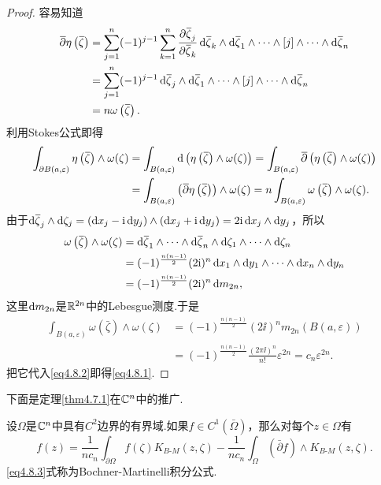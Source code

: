 \begin{proof}
	容易知道
	\begin{align*}
		\bar{\partial}\eta\left(\bar{\zeta}\right)
		&=\sum_{j=1}^{n}(-1)^{j-1}\sum_{k=1}^{n}\pp{\bar{\zeta}_j}{\bar{\zeta}_k}\dif\bar{\zeta}_k\wedge\dif\bar{\zeta}_1\wedge\cdots\wedge[j]\wedge\cdots\wedge\dif\bar{\zeta}_n\\
		&=\sum_{j=1}^{n}(-1)^{j-1}\dif\bar{\zeta}_j\wedge\dif\bar{\zeta}_1\wedge\cdots\wedge[j]\wedge\cdots\wedge\dif\bar{\zeta}_n\\
		&=n\omega\left(\bar{\zeta}\right).
	\end{align*}
利用Stokes公式即得
\begin{align}\label{eq4.8.2}
	\int_{\partial B(a,\varepsilon)} \eta\left({}\mkern1mu\overline{\mkern-1mu\zeta}\right)\wedge\omega(\zeta)
	&=\int_{B(a,\varepsilon)}\mathop{}\!\mathrm{d}\left(\eta\left({}\mkern1mu\overline{\mkern-1mu\zeta}\right)\wedge\omega(\zeta)\right)=\int_{B(a,\varepsilon)}{}\mkern1mu\overline{\mkern-1mu\partial}\left(\eta\left({}\mkern1mu\overline{\mkern-1mu\zeta}\right)\wedge\omega(\zeta)\right)\notag\\
	&=\int_{B(a,\varepsilon)}\left({}\mkern1mu\overline{\mkern-1mu\partial}\eta\left({}\mkern1mu\overline{\mkern-1mu\zeta}\right)\right)\wedge\omega(\zeta)=n\int_{B(a,\varepsilon)}\omega\left({}\mkern1mu\overline{\mkern-1mu\zeta}\right)\wedge\omega(\zeta).
\end{align}
由于$\dif\bar{\zeta}_j\wedge\dif\zeta_j=(\dx_j-\ii\dy_j)\wedge(\dx_j+\ii\dy_j)=2\ii\dx_j\wedge\dy_j$，所以
\begin{align*}
	\omega\left(\bar{\zeta}\right)\wedge\omega(\zeta)
	&=\dif\bar{\zeta}_1\wedge\cdots\wedge\dif\bar{\zeta}_n\wedge\dif\zeta_1\wedge\cdots\wedge\dif\zeta_n\\
	&=(-1)^{\frac{n(n-1)}{2}}(2\ii)^n \dx_1\wedge\dy_1\wedge\cdots\wedge\dx_n\wedge\dy_n\\
	&=(-1)^{\frac{n(n-1)}{2}}(2\ii)^n\dif m_{2n},
\end{align*}
这里$\mathop{}\!\mathrm{d} m_{2n}$是$\mathbb R^{2n}$中的Lebesgue测度.于是
\begin{align*}
	\int_{B(a,\varepsilon)}\omega\left(\bar{\zeta}\right)\wedge\omega(\zeta)
	&=(-1)^{\frac{n(n-1)}{2}}(2\ii)^n m_{2n}(B(a,\varepsilon))\\
	&=(-1)^{\frac{n(n-1)}{2}}\frac{(2\pi\ii)^n}{n!}\varepsilon^{2n}=c_n \varepsilon^{2n}.
\end{align*}
把它代入\eqref{eq4.8.2}即得\eqref{eq4.8.1}.
\end{proof}
下面是定理\ref{thm4.7.1}在$\mathbb C^n$中的推广.
\begin{theorem}\label{thm4.8.2}
	设$\Omega$是$\mathbb C^n$中具有$C^2$边界的有界域.如果$f\in C^1(\bar{\Omega})$，那么对每个$z\in\Omega$有
	\begin{equation}\label{eq4.8.3}
		f(z)=\frac1{nc_n}\int_{\partial\Omega}f(\zeta)K_{B\text{-}M}(z,\zeta)-\frac1{nc_n}\int_\Omega \left(\bar{\partial}f\right)\wedge K_{B\text{-}M}(z,\zeta).
	\end{equation}
\eqref{eq4.8.3}式称为Bochner-Martinelli积分公式.
\end{theorem}
